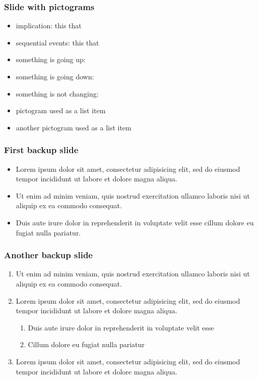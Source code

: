 \documentclass[11pt,xcolor={dvipsnames},hyperref={pdftex,pdfpagemode=UseNone,hidelinks,pdfdisplaydoctitle=true},usepdftitle=false]{beamer}
\begin{document}
\begin{frame}
\frametitle{Slide with pictograms}
\begin{itemize}
\item implication: this \so that
\item sequential events: this \then that
\item something is going up: \up
\item something is going down: \down
\item something is not changing: \flat 
\item[\so] pictogram used as a list item
\item[\then] another pictogram used as a list item
\end{itemize}
\end{frame}

\lastslide

\begin{frame}[label=backupSlide]
\frametitle{First backup slide}
\begin{itemize}
\item Lorem ipsum dolor sit amet, consectetur adipisicing elit, sed do eiusmod
tempor incididunt ut labore et dolore magna aliqua.
\item  Ut enim ad minim veniam, quis nostrud exercitation ullamco laboris nisi ut aliquip ex ea commodo consequat. 
\item Duis aute irure dolor in reprehenderit in voluptate velit esse
cillum dolore eu fugiat nulla pariatur. 
\end{itemize}
\hyperlink{firstSlide}{}
\end{frame}

\begin{frame}[label=anotherBackupSlide]
\frametitle{Another backup slide}
\begin{enumerate}
\item  Ut enim ad minim veniam, quis nostrud exercitation ullamco laboris nisi ut aliquip ex ea commodo consequat. 
\item Lorem ipsum dolor sit amet, consectetur adipisicing elit, sed do eiusmod
tempor incididunt ut labore et dolore magna aliqua.
\begin{enumerate}
\item Duis aute irure dolor in reprehenderit in voluptate velit esse
\item Cillum dolore eu fugiat nulla pariatur
\end{enumerate}
\item Lorem ipsum dolor sit amet, consectetur adipisicing elit, sed do eiusmod
tempor incididunt ut labore et dolore magna aliqua.
\end{enumerate}
\hyperlink{firstSlide}{}
\end{frame}
\end{document}
